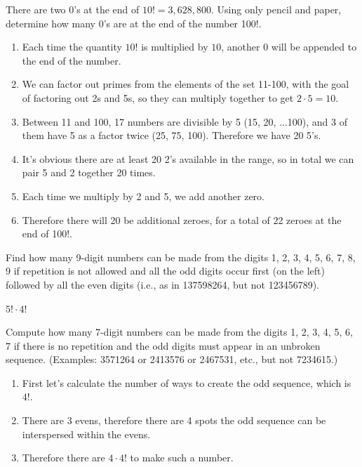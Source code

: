 \documentclass[openany, 11pt]{book}
\begin{document}
\begin{exercise}{}{}
	There are two 0's at the end of $10! = 3,628,800$. Using
	only pencil and paper, determine how many 0's are at the end of the number
	100!.
	\begin{enumerate}[label={\textbullet}, leftmargin=*, itemsep=0pt, parsep=0pt]
		\item Each time the quantity $10!$ is multiplied by $10$, another $0$ will be
		      appended to the end of the number.
		\item We can factor out primes from the elements of the set 11-100, with the goal
		      of factoring out 2s and 5s, so they can multiply together to get
		      $2\cdot5=10$.
		\item Between 11 and 100, 17 numbers are divisible by 5 (15, 20, ...100), and 3
		      of them have 5 as a factor twice (25, 75, 100). Therefore we have 20 5's.
		\item It's obvious there are at least 20 2's available in the range, so in total
		      we can pair 5 and 2 together 20 times.
		\item Each time we multiply by 2 and 5, we add another zero.
		\item Therefore there will 20 be additional zeroes, for a total of 22 zeroes at the end
		      of 100!.
	\end{enumerate}
\end{exercise}

\begin{exercise}{}{}
	Find how many 9-digit numbers can be made from the digits 1, 2, 3, 4, 5, 6, 7,
	8, 9 if repetition is not allowed and all the odd digits occur first (on the left)
	followed by all the even digits (i.e., as in 137598264, but not 123456789).

	$5! \cdot 4!$ \square
\end{exercise}

\begin{exercise}{}{}
	Compute how many 7-digit numbers can be made from the digits 1, 2, 3, 4, 5, 6, 7
	if there is no repetition and the odd digits must appear in an unbroken sequence.
	(Examples: 3571264 or 2413576 or 2467531, etc., but not 7234615.)
	\begin{enumerate}[label={\textbullet}, leftmargin=*, itemsep=0pt, parsep=0pt]
		\item First let's calculate the number of ways to create the odd sequence, which
		      is $4!$.
		\item There are 3 evens, therefore there are 4 spots the odd sequence can be
		      interspersed within the evens.
		\item Therefore there are $4\cdot 4!$ to make such a number.
		      \square
	\end{enumerate}
\end{exercise}
\end{document}

